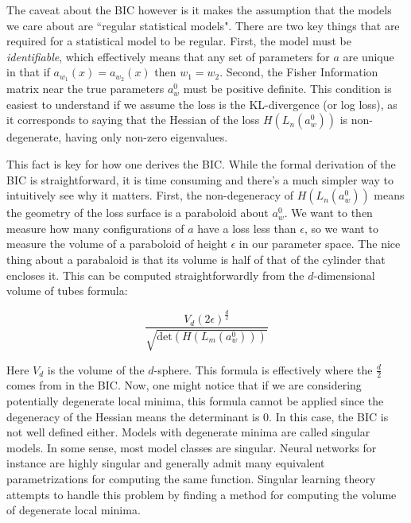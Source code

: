 \documentclass{article} %
\theoremstyle{definition}
\begin{document}
The caveat about the BIC however is it makes the assumption that the models we care about are ``regular statistical models". There are two key things that are required for a statistical model to be regular. First, the model must be \textit{identifiable}, which effectively means that any set of parameters for $a$ are unique in that if $a_{w_1}(x) = a_{w_2}(x)$ then $w_1 = w_2$. Second, the Fisher Information matrix near the true parameters $a_w^0$ must be positive definite. This condition is easiest to understand if we assume the loss is the KL-divergence (or log loss), as it corresponds to saying that the Hessian of the loss $H(L_n(a_w^0))$ is non-degenerate, having only non-zero eigenvalues.

This fact is key for how one derives the BIC. While the formal derivation of the BIC is straightforward, it is time consuming and there's a much simpler way to intuitively see why it matters. First, the non-degeneracy of $H(L_n(a_w^0))$ means the geometry of the loss surface is a paraboloid about $a_w^0$. We want to then measure how many configurations of $a$ have a loss less than $\epsilon$, so we want to measure the volume of a paraboloid of height $\epsilon$ in our parameter space. The nice thing about a parabaloid is that its volume is half of that of the cylinder that encloses it. This can be computed straightforwardly from the $d$-dimensional volume of tubes formula\citep{tubes}:

\begin{equation}
    \frac{V_d(2\epsilon)^{\frac{d}{2}}}{\sqrt{\text{det}{(H(L_m(a_w^0)))}}}
\end{equation}

Here $V_d$ is the volume of the $d$-sphere. This formula is effectively where the $\frac{d}{2}$ comes from in the BIC. Now, one might notice that if we are considering potentially degenerate local minima, this formula cannot be applied since the degeneracy of the Hessian means the determinant is 0. In this case, the BIC is not well defined either. Models with degenerate minima are called singular models. In some sense, most model classes are singular. Neural networks for instance are highly singular and generally admit many equivalent parametrizations for computing the same function. Singular learning theory attempts to handle this problem by finding a method for computing the volume of degenerate local minima.
\end{document}
